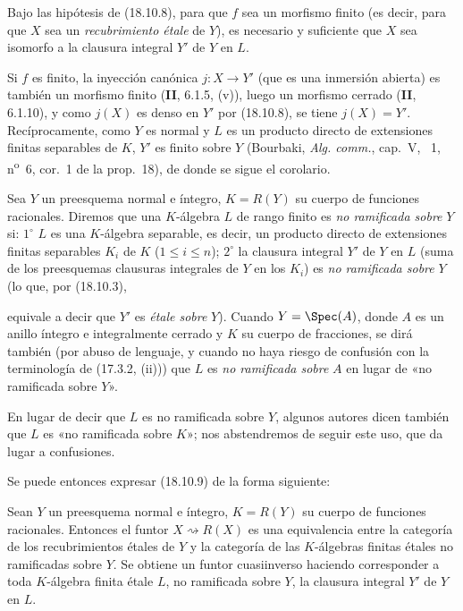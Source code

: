 \begin{corollary}[18.10.9]
\label{IV.18.10.9}
Bajo las hipótesis de \textup{(18.10.8)}, para que $f$ sea un morfismo finito \textup{(es decir, para que $X$ sea un \emph{recubrimiento étale} de $Y$)}, es necesario y suficiente que $X$ sea isomorfo a la clausura integral $Y'$ de $Y$ en $L$.
\end{corollary}

Si $f$ es finito, la inyección canónica $j:X\to Y'$ (que es una inmersión abierta) es también un morfismo finito (\textbf{II}, 6.1.5, (v)), luego un morfismo cerrado (\textbf{II}, 6.1.10), y como $j(X)$ es denso en $Y'$ por (18.10.8), se tiene $j(X)=Y'$. Recíprocamente, como $Y$ es normal y $L$ es un producto directo de extensiones finitas separables de $K$, $Y'$ es finito sobre $Y$ (Bourbaki, \emph{Alg. comm.}, cap.~V, \textsection~1, n\textsuperscript{o}~6, cor.~1 de la prop.~18), de donde se sigue el corolario.

\begin{env}[18.10.10]
\label{IV.18.10.10}
Sea $Y$ un preesquema normal e íntegro, $K=R(Y)$ su cuerpo de funciones racionales. Diremos que una $K$-álgebra $L$ de rango finito es \emph{no ramificada sobre} $Y$ si: $1^\circ$ $L$ es una $K$-álgebra separable, es decir, un producto directo de extensiones finitas separables $K_i$ de $K$ ($1\leq i\leq n$); $2^\circ$ la clausura integral $Y'$ de $Y$ en $L$ (suma de los preesquemas clausuras integrales de $Y$ en los $K_i$) es \emph{no ramificada sobre} $Y$ (lo que, por (18.10.3),


equivale a decir que $Y'$ es \emph{étale sobre} $Y$). Cuando $Y=\Spec(A)$, donde $A$ es un anillo íntegro e integralmente cerrado y $K$ su cuerpo de fracciones, se dirá también (por abuso de lenguaje, y cuando no haya riesgo de confusión con la terminología de (17.3.2, (ii))) que $L$ es \emph{no ramificada sobre} $A$ en lugar de «no ramificada sobre $Y$».
\end{env}

\begin{remark}[18.10.11]
\label{IV.18.10.11}
En lugar de decir que $L$ es no ramificada sobre $Y$, algunos autores dicen también que $L$ es «no ramificada sobre $K$»; nos abstendremos de seguir este uso, que da lugar a confusiones.
\end{remark}

Se puede entonces expresar (18.10.9) de la forma siguiente:

\begin{corollary}[18.10.12]
\label{IV.18.10.12}
Sean $Y$ un preesquema normal e íntegro, $K=R(Y)$ su cuerpo de funciones racionales. Entonces el funtor $X\rightsquigarrow R(X)$ es una equivalencia entre la categoría de los recubrimientos étales de $Y$ y la categoría de las $K$-álgebras finitas étales \textup{no ramificadas} sobre $Y$. Se obtiene un funtor cuasiinverso haciendo corresponder a toda $K$-álgebra finita étale $L$, no ramificada sobre $Y$, la clausura integral $Y'$ de $Y$ en $L$.
\end{corollary}

